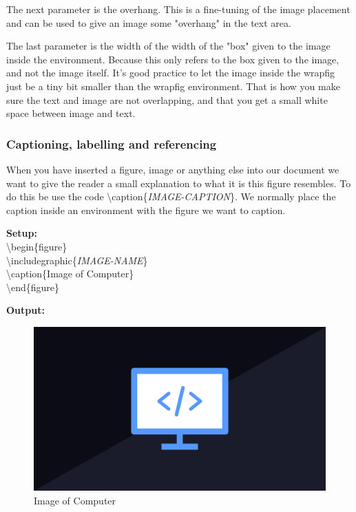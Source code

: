 \documentclass{article}
\newcommand{\jbs}[1]{\textbackslash{}#1} %
\begin{document}
The next parameter is the overhang. This is a fine-tuning of the image placement and can be used to give an image some "overhang" in the text area. 

The last parameter is the width of the width of the "box" given to the image inside the environment. Because this only refers to the box given to the image, and not the image itself.
It's good practice to let the image inside the wrapfig just be a tiny bit smaller than the wrapfig environment. That is how you make sure the text and image are not overlapping, and that you
get a small white space between image and text.

\subsubsection{Captioning, labelling and referencing}
When you have inserted a figure, image or anything else into our document we want to give the reader a small explanation to what
it is this figure resembles. To do this be use the code \jbs{caption\{\textit{IMAGE-CAPTION}\}}.
We normally place the caption inside an environment with the figure we want to caption. 

\begin{multicols}{2}
    \vspace{0.5em}
    \noindent
    \textbf{Setup:} \\
    \jbs{begin\{figure\}} \\
    \jbs{includegraphic\{\textit{IMAGE-NAME}\}} \\
    \jbs{caption\{Image of Computer\}} \\
    \jbs{end\{figure\}} \\
    \columnbreak

    \vspace{0.5em}
    \noindent
    \textbf{Output:}
    \begin{figure}[H]
        \includegraphics[scale=0.1]{Images/Programming.png}
        \caption{Image of Computer}
        \label{fig:image_of_computer_caption}
    \end{figure}
\end{multicols}
\end{document}
